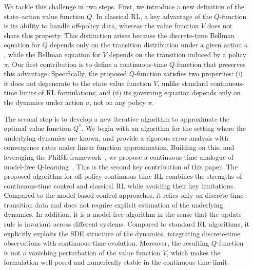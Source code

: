 \documentclass[12pt]{article}
\begin{document}
We tackle this challenge in two steps. First, we introduce a new definition of the state--action value function $Q$. In classical RL, a key advantage of the $Q$-function is its ability to handle off-policy data, whereas the value function $V$ does not share this property. This distinction arises because the discrete-time Bellman equation for $Q$ depends only on the transition distribution under a given action $a$, while the Bellman equation for $V$ depends on the transition induced by a policy $\pi$. Our first contribution is to define a continuous-time $Q$-function that preserves this advantage. Specifically, the proposed $Q$-function satisfies two properties: (i) it does not degenerate to the state value function $V$, unlike standard continuous-time limits of RL formulations; and (ii) its governing equation depends only on the dynamics under action $a$, not on any policy $\pi$.

The second step is to develop a new iterative algorithm to approximate the optimal value function $Q^*$. We begin with an algorithm for the setting where the underlying dynamics are known, and provide a rigorous error analysis with convergence rates under linear function approximation. Building on this, and leveraging the PhiBE framework~\citep{zhu2024phibe,zhu2025optimal}, we propose a continuous-time analogue of model-free Q-learning~\citep{watkins1992q}. This is the second key contribution of this paper. The proposed algorithm for off-policy continuous-time RL combines the strengths of continuous-time control and classical RL while avoiding their key limitations. Compared to the model-based control approaches, it relies only on discrete-time transition data and does not require explicit estimation of the underlying dynamics. In addition, it is a model-free algorithm in the sense that the update rule is invariant across different systems. Compared to standard RL algorithms, it explicitly exploits the SDE structure of the dynamics, integrating discrete-time observations with continuous-time evolution. Moreover, the resulting $Q$-function is not a vanishing perturbation of the value function $V$, which makes the formulation well-posed and numerically stable in the continuous-time limit.











\end{document}
